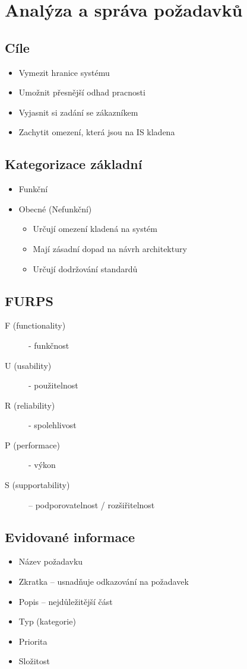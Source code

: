 \documentclass{szzclass}
\begin{document}
\tableofcontents
\newpage

\section{Analýza a správa požadavků}
\subsection{Cíle}
\begin{itemize}
\item Vymezit hranice systému
\item Umožnit přesnější odhad pracnosti
\item Vyjasnit si zadání se zákazníkem
\item Zachytit omezení, která jsou na IS kladena
\end{itemize}

\subsection{Kategorizace základní}
\begin{itemize}
\item Funkční
\item Obecné (Nefunkční)
  \begin{itemize}
  \item Určují omezení kladená na systém
  \item Mají zásadní dopad na návrh architektury
  \item Určují dodržování standardů
  \end{itemize}
\end{itemize}

\subsection{FURPS}
\begin{description}
\item[F (functionality)] - funkčnost
\item[U (usability)] - použitelnost
\item[R (reliability)] - spolehlivost
\item[P (performace)] - výkon
\item[S (supportability)] – podporovatelnost / rozšiřitelnost
\end{description}

\subsection{Evidované informace}
\begin{itemize}
\item Název požadavku
\item Zkratka – usnadňuje odkazování na požadavek
\item Popis – nejdůležitější část
\item Typ (kategorie)
\item Priorita
\item Složitost
\end{itemize}
\end{document}
